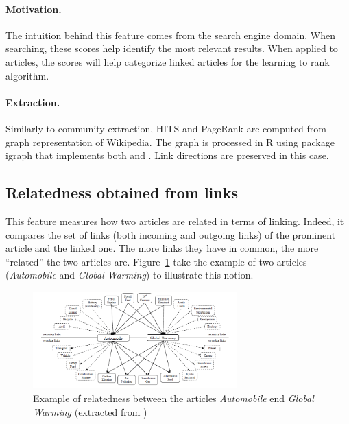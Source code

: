 \paragraph{Motivation.}
The intuition behind this feature comes from the search engine domain. When searching, these scores help identify the most relevant results. When applied to articles, the scores will help categorize linked articles for the learning to rank algorithm.

\paragraph{Extraction.}
Similarly to community extraction, HITS and PageRank are computed from graph representation of Wikipedia. The graph is processed in R using package igraph that implements both \cite{pagerank} and \cite{hits}. Link directions are preserved in this case.

\subsection{Relatedness obtained from links}
\label{relatedness obtained from links}
This feature measures how two articles are related in terms of linking. Indeed, it compares the set of links (both incoming and outgoing links) of the prominent article and the linked one. The more links they have in common, the more ``related'' the two articles are. Figure~\ref{fig:relatedness_example} take the example of two articles (\textit{Automobile} and \textit{Global Warming}) to illustrate this notion.

\begin{figure}[t]
\centering
    \includegraphics[width=0.7\textwidth]{images/relatedness}
 \caption{Example of relatedness between the articles \textit{Automobile} end \textit{Global Warming} (extracted from \cite{learning_link})}
 \label{fig:relatedness_example}
\end{figure}
